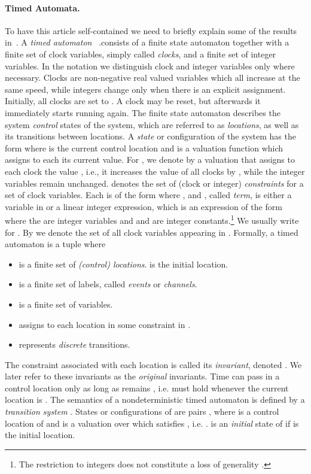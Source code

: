 \documentclass{eptcs}
\begin{document}
\paragraph{Timed Automata.}
To have this article self-contained we need to briefly explain some of the
results in~\cite{BaLeSm09}.  A {\em timed automaton}
~\cite{bluebook,alur94}.consists of a finite state automaton together with a
finite set of clock variables, simply called {\em clocks}, and a finite set of
integer variables.  In the notation we distinguish clock and integer variables
only where necessary.  Clocks are non-negative real valued variables which all
increase at the same speed, while integers change only when there is an
explicit assignment.  Initially, all clocks are set to .  A clock may be
reset, but afterwards it immediately starts running again.  The finite state
automaton describes the system {\em control} states of the system, which are
referred to as \emph{locations}, as well as its transitions between locations.
A {\em state} or configuration of the system has the form  where 
is the current control location and  is a valuation function which assigns
to each its current value.  For , we denote by  a
valuation that assigns to each clock  the value , i.e., it
increases the value of all clocks by , while the integer variables remain
unchanged.
 denotes the set of (clock or integer) {\em constraints}  for a set
   of clock variables. Each  is of the form  where , and , called {\em term}, is
  either a variable in  or a linear integer expression, which is an
  expression of the form  where the  are
  integer variables and  and  are integer constants.\footnote{The
    restriction to integers does not constitute a loss of generality
    \cite[Section 4.1]{alur94}.}  We usually write  for . By  we denote the set of all clock variables appearing in .
Formally, a timed automaton  is a tuple  where 
\begin{itemize}
\item  is a finite set of {\em (control) locations}.  is the initial location.
\item  is a finite set of labels, called {\em events} or {\em channels}.  
\item  is a finite set of variables. 
\item 
 assigns to each location in  some constraint in .   
\item  represents
  {\em discrete} transitions.
\end{itemize}


The constraint associated with each location  is called its {\em
  invariant}, denoted . We later refer to these invariants as the {\em
  original} invariants. Time can pass in a control location  only as long
as  remains , i.e.  must hold whenever the current location
is .
The semantics of a nondeterministic timed automaton  is defined by a {\em transition
  system} . 
States or configurations of  are
pairs , where  is a control location of  and  is a
valuation over  which satisfies , i.e. . 
 is an {\em initial} state of  if  is the initial location.
\end{document}
